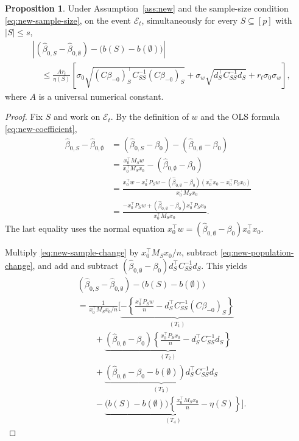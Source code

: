 \documentclass[a4paper,10pt,english]{article}
\theoremstyle{definition}
\newtheorem{proposition}{Proposition}
\begin{document}
\begin{review}
\begin{proposition}\label{prop:new-coefficient}
Under Assumption~\ref{ass:new} and the sample-size condition
\eqref{eq:new-sample-size}, on the event \(\mathcal E_t\), simultaneously
for every \(S\subseteq[p]\) with \(|S|\le s\),
\begin{equation}\label{eq:new-coefficient-bound}
 \begin{aligned}
 &\left|
 (\hat\beta_{0,S}-\hat\beta_{0,\emptyset})
 -\bigl(b(S)-b(\emptyset)\bigr)
 \right|\\
 &\quad\le
 \frac{A r_t}{\eta(S)}
 \left[
 \sigma_0
 \sqrt{(C\beta_{-0})_S^\top C_{SS}^{-1}(C\beta_{-0})_S}
 +\sigma_w\sqrt{d_S^\top C_{SS}^{-1}d_S}
 +r_t\sigma_0\sigma_w
 \right],
 \end{aligned}
\end{equation}
where \(A\) is a universal numerical constant.
\end{proposition}

\begin{proof}
Fix \(S\) and work on \(\mathcal E_t\).
\rbreak
By the definition of \(w\) and the OLS formula
\eqref{eq:new-coefficient},
\begin{equation}\label{eq:new-sample-change}
 \begin{aligned}
 \hat\beta_{0,S}-\hat\beta_{0,\emptyset}
 &=(\hat\beta_{0,S}-\beta_0)
 -(\hat\beta_{0,\emptyset}-\beta_0)\\
 &=
 \frac{x_0^\top M_Sw}{x_0^\top M_Sx_0}
 -(\hat\beta_{0,\emptyset}-\beta_0)\\
 &=
 \frac{
 x_0^\top w-x_0^\top P_Sw
 -(\hat\beta_{0,\emptyset}-\beta_0)
 (x_0^\top x_0-x_0^\top P_Sx_0)
 }{x_0^\top M_Sx_0}\\
 &=
 \frac{
 -x_0^\top P_Sw
 +(\hat\beta_{0,\emptyset}-\beta_0)x_0^\top P_Sx_0
 }{x_0^\top M_Sx_0}.
 \end{aligned}
\end{equation}
The last equality uses the normal equation
\(x_0^\top w=(\hat\beta_{0,\emptyset}-\beta_0)x_0^\top x_0\).

Multiply \eqref{eq:new-sample-change} by \(x_0^\top M_Sx_0/n\),
subtract \eqref{eq:new-population-change}, and add and subtract
\((\hat\beta_{0,\emptyset}-\beta_0)d_S^\top C_{SS}^{-1}d_S\).
\rbreak
This yields
\begin{equation}\label{eq:new-four-terms}
 \begin{aligned}
 &(\hat\beta_{0,S}-\hat\beta_{0,\emptyset})
 -\bigl(b(S)-b(\emptyset)\bigr)\\
 &=\frac{1}{x_0^\top M_Sx_0/n}
 \Bigg[
 \underbrace{
 -\left\{\frac{x_0^\top P_Sw}{n}
 -d_S^\top C_{SS}^{-1}(C\beta_{-0})_S\right\}
 }_{(T_1)}\\
 &\qquad+
 \underbrace{
 (\hat\beta_{0,\emptyset}-\beta_0)
 \left\{\frac{x_0^\top P_Sx_0}{n}
 -d_S^\top C_{SS}^{-1}d_S\right\}
 }_{(T_2)}\\
 &\qquad+
 \underbrace{
 (\hat\beta_{0,\emptyset}-\beta_0-b(\emptyset))
 d_S^\top C_{SS}^{-1}d_S
 }_{(T_3)}\\
 &\qquad-
 \underbrace{
 \bigl(b(S)-b(\emptyset)\bigr)
 \left\{\frac{x_0^\top M_Sx_0}{n}-\eta(S)\right\}
 }_{(T_4)}
 \Bigg].
 \end{aligned}
\end{equation}


\end{proof}
\end{review}
\end{document}
